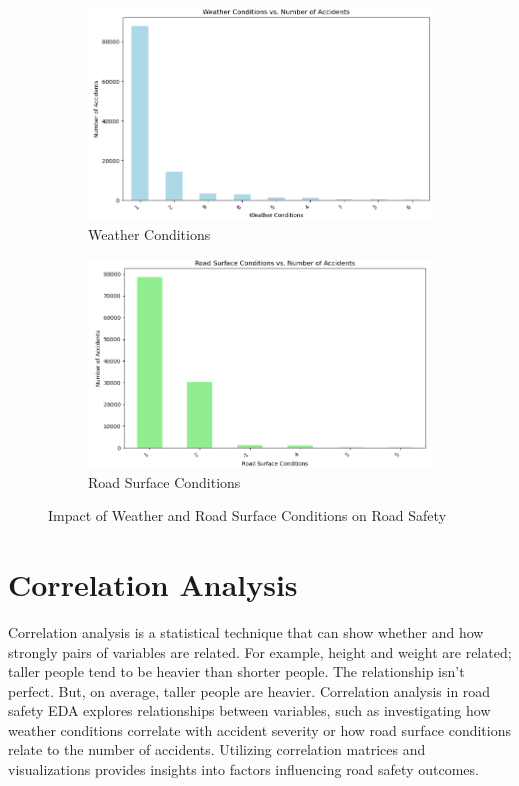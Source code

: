 \documentclass{article}
\begin{document}
\begin{figure}[ht]
  \centering
  \begin{subfigure}{0.48\textwidth}
    \centering
    \includegraphics[width=\textwidth]{Images/weather_conditions.png}
    \caption{Weather Conditions}
  \end{subfigure}
  \hfill
  \begin{subfigure}{0.48\textwidth}
    \centering
    \includegraphics[width=\textwidth]{Images/road_surface_conditions.png}
    \caption{Road Surface Conditions}
  \end{subfigure}
  \caption{Impact of Weather and Road Surface Conditions on Road Safety}
\end{figure}

\section{Correlation Analysis}
Correlation analysis is a statistical technique that can show whether and how strongly pairs of variables are
related. For example, height and weight are related; taller people tend to be heavier than shorter people. The
relationship isn't perfect. But, on average, taller people are heavier. Correlation analysis in road safety EDA
explores relationships between variables, such as investigating how weather conditions correlate with accident
severity or how road surface conditions relate to the number of accidents. Utilizing correlation matrices and
visualizations provides insights into factors influencing road safety outcomes.
\end{document}
